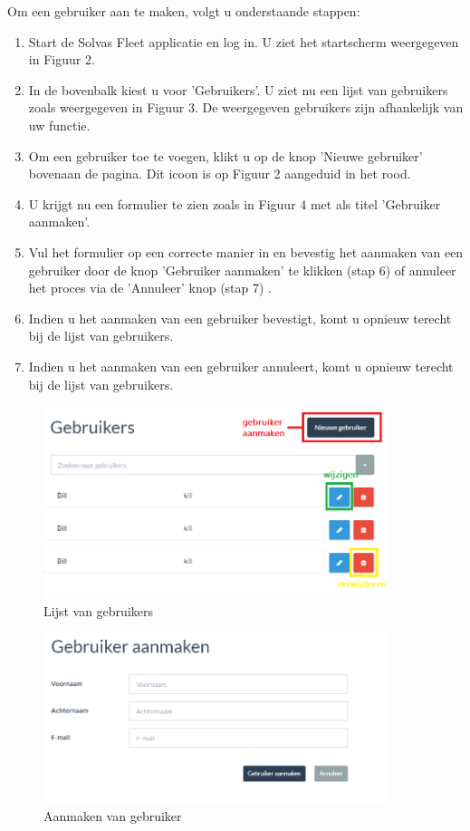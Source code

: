 \documentclass[11pt,openany]{article}
\begin{document}
Om een gebruiker aan te maken, volgt u onderstaande stappen:
\begin{enumerate}
	\item Start de Solvas Fleet applicatie en log in. U ziet het startscherm weergegeven in Figuur 2.
	\item In de bovenbalk kiest u voor 'Gebruikers'. U ziet nu een lijst van gebruikers zoals weergegeven in Figuur 3. De weergegeven gebruikers zijn afhankelijk van uw functie.
	\item Om een gebruiker toe te voegen, klikt u op de knop 'Nieuwe gebruiker' bovenaan de pagina. Dit icoon is op Figuur 2 aangeduid in het rood.
	\item U krijgt nu een formulier te zien zoals	 in Figuur 4 met als titel 'Gebruiker aanmaken'.
	\item Vul het formulier op een correcte manier in en bevestig het aanmaken van een gebruiker door de knop 'Gebruiker aanmaken' te klikken (stap 6) of annuleer het proces via de 'Annuleer' knop (stap 7) .
	\item Indien u het aanmaken van een gebruiker bevestigt, komt u opnieuw terecht bij de lijst van gebruikers. 

	\item Indien u het aanmaken van een gebruiker annuleert, komt u opnieuw terecht bij de lijst van gebruikers.
\end{enumerate}
	
	\begin{figure}
		\centering
		\includegraphics[width=0.9\textwidth]{img/fig_c.png}
		\caption{Lijst van gebruikers}
	\end{figure}

\begin{figure}
	\centering
	\includegraphics[width=0.9\textwidth]{img/fig_d.png}
	\caption{Aanmaken van gebruiker}
\end{figure}
	
\end{document}
